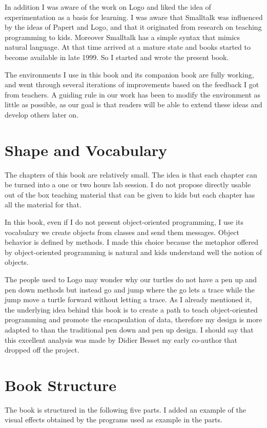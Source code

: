 In addition I was aware of the work on Logo and liked the idea of experimentation as a basis for learning. I was aware that Smalltalk was influenced by the ideas of Papert and Logo, and that it originated from research on teaching programming to kids. Moreover Smalltalk has a simple syntax that mimics natural language. At that time \sq arrived at a mature state and books started to become available in late 1999. So I started and wrote the present book. 

The environments I use in this book and its companion book are fully working, and went through several iterations of improvements based on the feedback I got from teachers. 
A guiding rule in our work has been to modify the \sq environment as little as possible, as our goal is that readers will be able to extend these ideas and develop others later on. 


\section*{Shape and Vocabulary} 

The chapters of this book are relatively small. The idea is that each chapter can be turned into a one or two hours lab session. I do not propose directly usable out of the box teaching material that can be given to kids but each chapter has all the material for that. 

In this book, even if I do not present object-oriented programming, I use its vocabulary \ie we create objects from classes and send them messages. Object behavior is defined by methods. I made this choice because the metaphor offered by object-oriented programming is natural and kids understand well the notion of objects. 

The people used to Logo may wonder why our turtles do not have a pen up and pen down methods but instead go and jump where the go lets a trace while the jump move a turtle forward without letting a trace. As I already mentioned it, the underlying idea behind this book is to create a path to teach object-oriented programming and promote the encapsulation of data, therefore my design is more adapted to than the traditional pen down and pen up design.  I should say that this excellent analysis was made by Didier Besset my early co-author that dropped off the project. 

\section*{Book Structure}
The book is structured in the following five parts. I added an example of the visual effects obtained by the programs used as example in the parts. 

